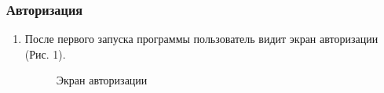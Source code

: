 \documentclass{../includes/TechDoc}
\begin{document}
    \subsubsection{Авторизация}

    \begin{enumerate}
        \item После первого запуска программы пользователь видит экран авторизации (Рис. 1).
        \begin{figure}[h]
            \centering
            \caption{Экран авторизации}
            \label{fig:login}
        \end{figure}


\end{enumerate}
\end{document}
